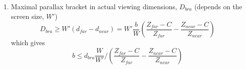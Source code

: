 \documentclass[12pt,a4paper]{article}
\def\p{\mathbf p}
\begin{document}
\begin{enumerate}
  \item Maximal parallax bracket  in actual viewing dimensions, $D_{bra}$ (depends on the screen size, $W'$)
 \begin{equation}
 D_{bra} \geq W'(d_{far} - d_{near}) = W' \frac{b}{W} \left(\frac{Z_{far} - C}{Z_{far}} - \frac{Z_{near} - C}{Z_{near}} \right)
 \end{equation}
 which gives
 \begin{equation}
 b \leq d_{bra} \frac{W}{W'} \bigg/ \left( \frac{Z_{far} - C}{Z_{far}} - \frac{Z_{near} - C}{Z_{near}} \right)
 \end{equation}

 
 
\end{enumerate}



%
%
%
\end{document}

